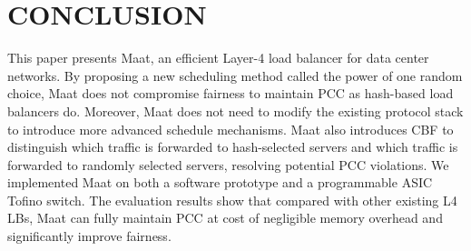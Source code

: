 \section{CONCLUSION}
This paper presents Maat, an efficient Layer-4 load balancer for data center networks. By proposing a new scheduling method called the power of one random choice, Maat does not compromise fairness to maintain PCC as hash-based load balancers do. Moreover, Maat does not need to modify the existing protocol stack to introduce more advanced schedule mechanisms. Maat also introduces CBF to distinguish which traffic is forwarded to hash-selected servers and which traffic is forwarded to randomly selected servers, resolving potential PCC violations. We implemented Maat on both a software prototype and a programmable ASIC Tofino switch. The evaluation results show that compared with other existing L4 LBs, Maat can fully maintain PCC at cost of negligible memory overhead and significantly improve fairness.